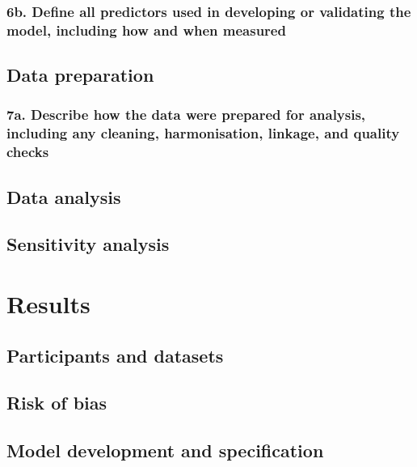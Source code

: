 \documentclass[
  letterpaper,
  DIV=11,
  numbers=noendperiod]{scrartcl}
\begin{document}
\subsubsection{6b. Define all predictors used in developing or
validating the model, including how and when
measured}\label{b.-define-all-predictors-used-in-developing-or-validating-the-model-including-how-and-when-measured}

\subsection{Data preparation}\label{data-preparation}

\subsubsection{7a. Describe how the data were prepared for analysis,
including any cleaning, harmonisation, linkage, and quality
checks}\label{a.-describe-how-the-data-were-prepared-for-analysis-including-any-cleaning-harmonisation-linkage-and-quality-checks}

\subsection{Data analysis}\label{data-analysis}

\subsection{Sensitivity analysis}\label{sensitivity-analysis}

\section{Results}\label{results}

\subsection{Participants and datasets}\label{participants-and-datasets}

\subsection{Risk of bias}\label{risk-of-bias}

\subsection{Model development and
specification}\label{model-development-and-specification}
\end{document}
